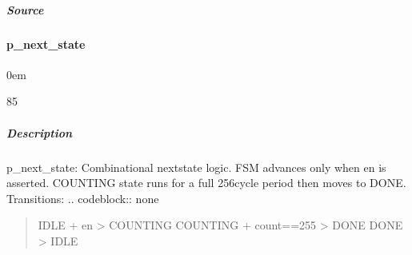 \documentclass[letterpaper,10pt,english]{sphinxmanual}
\begin{document}
\subparagraph{Source}
\label{\detokenize{modules/pwm_controller/processes/p_state_reg:source}}
\begin{sphinxVerbatim}[commandchars=\\\{\}]
\end{sphinxVerbatim}

\sphinxstepscope


\paragraph{p\_next\_state}
\label{\detokenize{modules/pwm_controller/processes/p_next_state:p-next-state}}\label{\detokenize{modules/pwm_controller/processes/p_next_state::doc}}
\begin{DUlineblock}{0em}
\item[]  
\item[]  85
\item[]  
\item[]  \sphinxcode{\sphinxupquote{*}}
\end{DUlineblock}


\subparagraph{Description}
\label{\detokenize{modules/pwm_controller/processes/p_next_state:description}}
\sphinxAtStartPar
p\_next\_state: Combinational next\sphinxhyphen{}state logic.
FSM advances only when en is asserted.
COUNTING state runs for a full 256\sphinxhyphen{}cycle period then moves to DONE.
Transitions:
.. code\sphinxhyphen{}block:: none
\begin{quote}

\sphinxAtStartPar
IDLE     + en           \sphinxhyphen{}\textgreater{} COUNTING
COUNTING + count==255   \sphinxhyphen{}\textgreater{} DONE
DONE                    \sphinxhyphen{}\textgreater{} IDLE
\end{quote}
\end{document}
